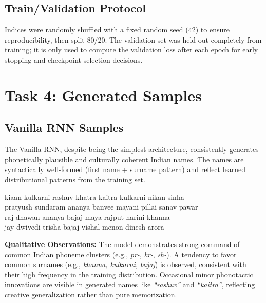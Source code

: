 \documentclass[11pt,a4paper]{article}
\begin{document}
\subsection{Train/Validation Protocol}
Indices were randomly shuffled with a fixed random seed (42) to ensure reproducibility, then split 80/20. The validation set was held out completely from training; it is only used to compute the validation loss after each epoch for early stopping and checkpoint selection decisions.

\clearpage
\section{Task 4: Generated Samples}

\subsection{Vanilla RNN Samples}
The Vanilla RNN, despite being the simplest architecture, consistently generates phonetically plausible and culturally coherent Indian names. The names are syntactically well-formed (first name + surname pattern) and reflect learned distributional patterns from the training set.

\begin{codeBox}[Selected Vanilla RNN Generated Names (Temperature = 0.8)]
kiaan kulkarni \quad rashuv khatra \quad kaitra kulkarni \quad nikan sinha \\
pratyush sundaram \quad ananya banvee \quad mayani pillai \quad sanav pawar \\
raj dhawan \quad ananya bajaj \quad maya rajput \quad harini khanna \\
jay dwivedi \quad trisha bajaj \quad vishal menon \quad dinesh arora
\end{codeBox}

\vspace{0.5em}

\textbf{Qualitative Observations:} The model demonstrates strong command of common Indian phoneme clusters (e.g., \textit{pr-}, \textit{kr-}, \textit{sh-}). A tendency to favor common surnames (e.g., \textit{khanna, kulkarni, bajaj}) is observed, consistent with their high frequency in the training distribution. Occasional minor phonotactic innovations are visible in generated names like \textit{``rashuv''} and \textit{``kaitra''}, reflecting creative generalization rather than pure memorization.
\end{document}
